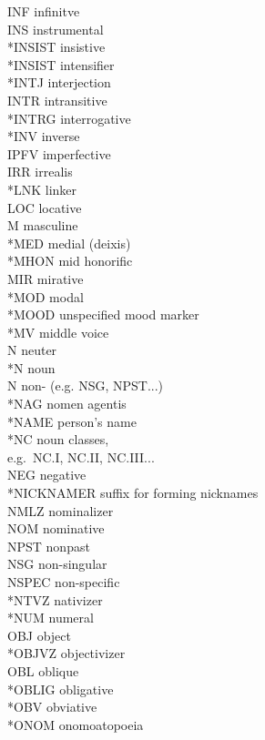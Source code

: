 \documentclass[a4paper, 11pt]{book}
\begin{document}
\begin{multicols}{2}
\begin{tabbing}
	INF \> infinitve \\
	INS \> instrumental \\
	*INSIST \> insistive \\
	*INSIST \> intensifier \\
	*INTJ \> interjection \\
	INTR \> intransitive \\
	*INTRG \> interrogative \\
	*INV \> inverse \\
	IPFV \> imperfective	\\
	IRR \> irrealis \\
	*LNK \> linker \\
	LOC \> locative \\
	M \> masculine \\
	*MED \> medial (deixis) \\
	*MHON \> mid honorific \\
	MIR \> mirative \\
	*MOD \> modal \\
	*MOOD \> unspecified mood marker \\
	*MV \> middle voice \\
	N \> neuter \\
	*N \> noun \\
	N \> non- (e.g. NSG, NPST...) \\
	*NAG \> nomen agentis \\
	*NAME \> person's name \\
	*NC \> noun classes, \\
		\> e.g.\ NC.I, NC.II, NC.III... \\
	NEG \> negative \\
	*NICKNAMER \> suffix for forming nicknames \\
	NMLZ \> nominalizer \\
	NOM \> nominative \\
	NPST \> nonpast \\
	NSG \> non-singular \\
	NSPEC \> non-specific \\
	*NTVZ \> nativizer \\
	*NUM \> numeral \\
	OBJ \> object \\
	*OBJVZ \> objectivizer \\
	OBL \> oblique \\
	*OBLIG \> obligative \\
	*OBV \> obviative \\
	*ONOM \> onomoatopoeia \\

\end{tabbing}
\end{multicols}
\end{document}
